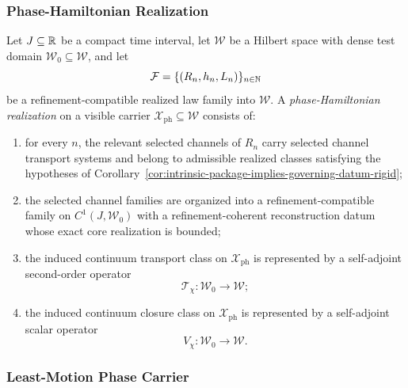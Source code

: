 \subsubsection{Phase-Hamiltonian Realization}

\begin{definition}
\label{def:phase-hamiltonian-realization}
Let \(J\subseteq \mathbb{R}\) be a compact time interval, let \(\mathcal W\) be a
Hilbert space with dense test domain \(\mathcal W_0\subseteq\mathcal W\), and
let
\[
\mathcal F=\{(R_n,h_n,L_n)\}_{n\in\mathbb{N}}
\]
be a refinement-compatible realized law family into \(\mathcal W\). A
\emph{phase-Hamiltonian realization} on a visible carrier
\(\mathcal X_{\mathrm{ph}}\subseteq\mathcal W\) consists of:
\begin{enumerate}[label=(\roman*),itemsep=0.2em]
\item for every \(n\), the relevant selected channels of \(R_n\) carry
      selected channel transport systems and belong to admissible realized
      classes satisfying the hypotheses of
      Corollary~\ref{cor:intrinsic-package-implies-governing-datum-rigid};
\item the selected channel families are organized into a
      refinement-compatible family on \(C^1(J,\mathcal W_0)\) with a
      refinement-coherent reconstruction datum whose exact core realization is
      bounded;
\item the induced continuum transport class on \(\mathcal X_{\mathrm{ph}}\) is
      represented by a self-adjoint second-order operator
      \[
      \mathcal T_{\chi}:\mathcal W_0\to\mathcal W;
      \]
\item the induced continuum closure class on \(\mathcal X_{\mathrm{ph}}\) is
      represented by a self-adjoint scalar operator
      \[
      V_{\chi}:\mathcal W_0\to\mathcal W.
      \]
\end{enumerate}
\end{definition}

\subsubsection{Least-Motion Phase Carrier}

